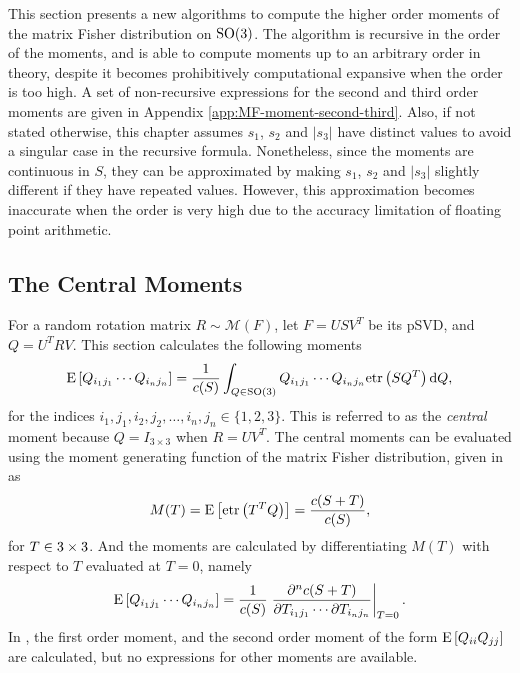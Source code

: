 This section presents a new algorithms to compute the higher order moments of the matrix Fisher distribution on $\mathrm{SO}(3)$.
The algorithm is recursive in the order of the moments, and is able to compute moments up to an arbitrary order in theory, despite it becomes prohibitively computational expansive when the order is too high.
A set of non-recursive expressions for the second and third order moments are given in Appendix \ref{app:MF-moment-second-third}.
Also, if not stated otherwise, this chapter assumes $s_1$, $s_2$ and $|s_3|$ have distinct values to avoid a singular case in the recursive formula.
Nonetheless, since the moments are continuous in $S$, they can be approximated by making $s_1$, $s_2$ and $|s_3|$ slightly different if they have repeated values.
However, this approximation becomes inaccurate when the order is very high due to the accuracy limitation of floating point arithmetic.

\subsection{The Central Moments}

For a random rotation matrix $R\sim\mathcal{M}(F)$, let $F=USV^T$ be its pSVD, and $Q = U^TRV$.
This section calculates the following moments
\begin{align} \label{eqn:MF-moment-int}
	\mathrm{E}\left[ Q_{i_1j_1} \cdots Q_{i_nj_n} \right] = \frac{1}{c(S)} \int_{Q\in\mathrm{SO}(3)} Q_{i_1j_1} \cdots Q_{i_nj_n} \mathrm{etr}\left( SQ^T \right) \mathrm{d} Q,
\end{align}
for the indices $i_1,j_1,i_2,j_2,\ldots, i_n,j_n\in\{1,2,3\}$.
This is referred to as the \textit{central} moment because $Q=I_{3\times 3}$ when $R= UV^T$.
The central moments can be evaluated using the moment generating function of the matrix Fisher distribution, given in \cite{khatri1977mises,lee2018bayesian} as
\begin{equation}
	M(T) = \mathrm{E}\left[ \mathrm{etr}\left( T^TQ \right) \right] = \frac{c(S+T)}{c(S)},
\end{equation}
for $T\in\real{3\times 3}$. 
And the moments are calculated by differentiating $M(T)$ with respect to $T$ evaluated at $T=0$, namely
\begin{equation} \label{eqn:MF-moment-dcdT}
	\mathrm{E}\left[ Q_{i_1j_1} \cdots Q_{i_nj_n} \right] = \frac{1}{c(S)} \left. \frac{\partial^n c(S+T)}{\partial T_{i_1j_1} \cdots \partial T_{i_nj_n}} \right|_{T=0}.
\end{equation}
In \cite{lee2018bayesian,khatri1977mises}, the first order moment, and the second order moment of the form $\mathrm{E}\left[ Q_{ii}Q_{jj} \right]$ are calculated, but no expressions for other moments are available.

